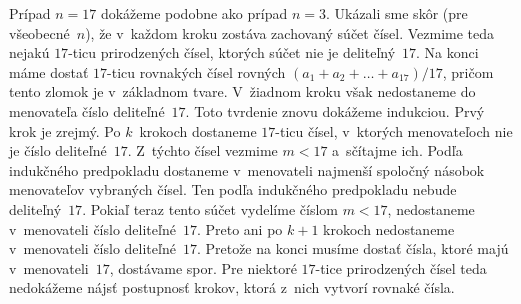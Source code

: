 {Prípad $n = 17$ dokážeme podobne ako prípad $n = 3$. Ukázali
sme skôr (pre všeobecné~$n$), že v~každom kroku zostáva zachovaný
súčet čísel. Vezmime teda nejakú $17$-ticu prirodzených čísel,
ktorých súčet nie je deliteľný~$17$. Na konci máme dostať \hbox{$17$-ticu}
rovnakých čísel rovných $(a_1 + a_2 + \dots + a_{17})/17$,
pričom tento zlomok je v~základnom tvare. V~žiadnom kroku však
nedostaneme do menovateľa číslo deliteľné~$17$. Toto tvrdenie znovu dokážeme
indukciou. Prvý krok je zrejmý. Po $k$~krokoch dostaneme \hbox{$17$-ticu}
čísel, v~ktorých menovateľoch nie je číslo deliteľné~$17$. Z~týchto čísel
vezmime $m < 17$ a~sčítajme ich. Podľa indukčného predpokladu
dostaneme v~menovateli najmenší spoločný násobok menovateľov
vybraných čísel. Ten podľa indukčného predpokladu nebude
deliteľný~$17$. Pokiaľ teraz tento súčet vydelíme číslom $m < 17$,
nedostaneme v~menovateli číslo deliteľné~$17$. Preto ani po $k +
1$ krokoch nedostaneme v~menovateli číslo deliteľné~$17$. Pretože
na konci musíme dostať čísla, ktoré majú v~menovateli~$17$,
dostávame spor. Pre niektoré $17$-tice prirodzených čísel teda
nedokážeme nájsť postupnosť krokov, ktorá z~nich vytvorí rovnaké
čísla.}

